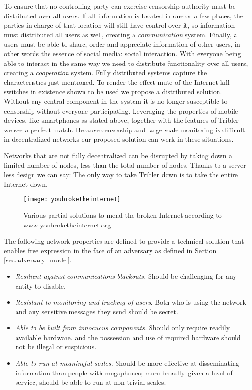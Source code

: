 To ensure that no controlling party can exercise censorship authority must be distributed over all users. %
If all information is located in one or a few places, the parties in charge of that location will still have control over it, so information must distributed all users as well, creating a \emph{communication} system.
Finally, all users must be able to share, order and appreciate information of other users, in other words the essence of social media: social interaction.
With everyone being able to interact in the same way we need to  distribute functionality over all users, creating a \emph{cooperation} system.
Fully distributed systems capture the characteristics just mentioned.
To render the effect mute of the Internet kill switches in existence shown to be used we propose a distributed solution.
Without any central component in the system it is no longer susceptible to censorship without everyone participating.
Leveraging the properties of mobile devices, like smartphones as stated above, together with the features of Tribler we see a perfect match.
Because censorship and large scale monitoring is difficult in decentralized networks our proposed solution can work in these situations.

Networks that are not fully decentralized can be disrupted by taking down a limited number of nodes, less than the total number of nodes.
Thanks to a server-less design we can say:
The only way to take Tribler down is to take the entire Internet down.

\begin{figure}[H]
	\centering
	\texttt{[image: youbroketheinternet]}
	\caption{Various partial solutions to mend the broken Internet according to www.youbroketheinternet.org}
	\label{fig:youbroketheinternet}
\end{figure}

The following network properties are defined \cite{hasan2013dissent} to provide a technical solution that enables free expression in the face of an adversary as defined in Section \ref{sec:adversary_model}:
\begin{itemize}
	\item \emph{Resilient against communications blackouts.}
	Should be challenging for any entity to disable.
	\item \emph{Resistant to monitoring and tracking of users.}
	Both who is using the network and any sensitive messages they send should be secret.
	\item \emph{Able to be built from innocuous components.}
	Should only require readily available hardware, and the possession and use of required hardware should not be illegal or suspicious.
	\item \emph{Able to run at meaningful scales.}
	Should be more effective at disseminating information than people with megaphones; more broadly, given a level of service, should be able to run at non-trivial scales.
\end{itemize}
 
